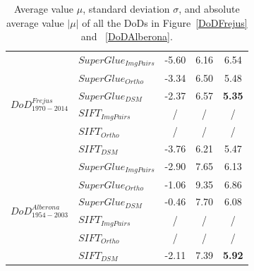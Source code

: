 \begin{table}
\begin{tabular}{||l|l|c|c|c||}
		\multirow{6}{*}{$DoD^{Frejus}_{1970-2014}$}
				&${SuperGlue_{ImgPairs}}$ & -5.60 & 6.16 & 6.54\\
&${SuperGlue_{Ortho}}$ & -3.34 & 6.50 & 5.48\\
&${SuperGlue_{DSM}}$ & -2.37 & 6.57 & \textbf{5.35}\\
		&${SIFT_{ImgPairs}}$ & / & / & / \\
		&${SIFT_{Ortho}}$ & / & / & / \\
&${SIFT_{DSM}}$ & -3.76 & 6.21 & 5.47\\\hline
		
		\multirow{6}{*}{$DoD^{Alberona}_{1954-2003}$}
&${SuperGlue_{ImgPairs}}$ & -2.90 & 7.65 & 6.13\\
&${SuperGlue_{Ortho}}$ & -1.06 & 9.35 & 6.86\\
&${SuperGlue_{DSM}}$ & -0.46 & 7.70 & 6.08\\
&${SIFT_{ImgPairs}}$ & / & / & / \\
&${SIFT_{Ortho}}$ & / & / & / \\
&${SIFT_{DSM}}$ & -2.11 & 7.39 & \textbf{5.92}\\\hline
	\end{tabular}
	\caption{Average value $\mu$, standard deviation $\sigma$, and absolute average value $|\mu|$ of all the \ac{DoD}s in Figure~\ref{DoDFrejus} and ~\ref{DoDAlberona}.}
	\label{RoughDoDStatistic}
\end{table}


